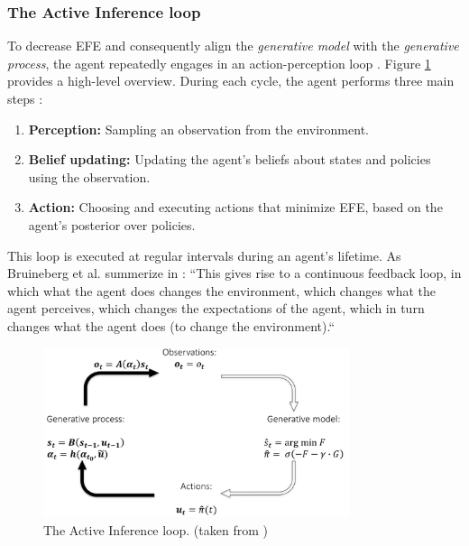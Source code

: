 \subsubsection{The Active Inference loop}
\label{sec:active-inference-loop}
To decrease EFE and consequently align the \textit{generative model} with the \textit{generative process}, the agent repeatedly engages in an action-perception loop \cite{sedlak_equilibrium_2024}. Figure \ref{fig:acive-inference-loop} provides a high-level overview. During each cycle, the agent performs three main steps \cite{heins_pymdp_2022}:
\begin{enumerate}
    \item \textbf{Perception:} Sampling an observation from the environment.
    \item \textbf{Belief updating:} Updating the agent’s beliefs about states and policies using the
observation.
    \item \textbf{Action:} Choosing and executing actions that minimize EFE, based on the agent’s posterior over policies.
\end{enumerate}

This loop is executed at regular intervals during an agent's lifetime. As Bruineberg et al. summerize in \cite{bruineberg_free-energy_2018}: ``This gives rise to a continuous feedback loop, in which what the agent does changes the environment, which changes what the agent perceives, which changes the expectations of the agent, which in turn changes what the agent does (to change the environment).``

\begin{figure}[htbp]
    \centering
    \includegraphics[width=0.8\textwidth]{img/active-inference-loop.png}
    \caption{The Active Inference loop. (taken from \cite{bruineberg_free-energy_2018})}
    \label{fig:acive-inference-loop}
\end{figure}

